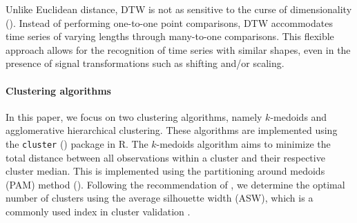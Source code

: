 \documentclass[a4paper,review,12pt,authoryear]{elsarticle}
\begin{document}
Unlike Euclidean distance, DTW is not as sensitive to the curse of dimensionality (\citealp{sakoeDynamicProgrammingAlgorithm1978}). Instead of performing one-to-one point comparisons, DTW accommodates time series of varying lengths through many-to-one comparisons. This flexible approach allows for the recognition of time series with similar shapes, even in the presence of signal transformations such as shifting and/or scaling.


\paragraph{\textbf{Clustering algorithms}}
In this paper, we focus on two clustering algorithms, namely $k$-medoids and agglomerative hierarchical clustering. These algorithms are implemented using the \texttt{cluster} (\citealp{cluster}) package in R. {The $k$-medoids algorithm aims to minimize the total distance between all observations within a cluster and their respective cluster median.} This is implemented using the partitioning around medoids (PAM) method (\citealp{PartitioningMedoidsProgram1990}).
Following the recommendation of \cite{PartitioningMedoidsProgram1990}, we determine the optimal number of clusters using the average silhouette width (ASW), which is a commonly used index in cluster validation \citep[see \textit{e.g.}, ][]{shutaywi2021silhouette}.
\end{document}
